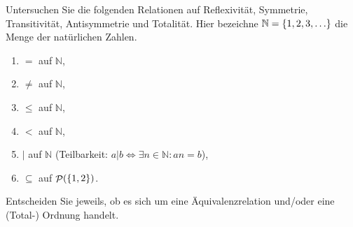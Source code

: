 \documentclass[german,12pt]{homework}
\newcommand{\NN}{\mathbb{N}}
\DeclareMathOperator{\pot}{\mathcal{P}}
\DeclarePairedDelimiter{\enbrace}{(}{)}
\DeclarePairedDelimiter{\penbrace}{\{}{\}}
\begin{document}
    \begin{problem}
        Untersuchen Sie die folgenden Relationen auf Reflexivität, Symmetrie,
        Transitivität, Antisymmetrie und Totalität. Hier bezeichne \(\NN =
        \penbrace*{1, 2, 3, \ldots}\) die Menge der natürlichen Zahlen.
        \begin{enumerate}
            \item \(=\) auf \(\NN\),
            \item \(\ne\) auf \(\NN\),
            \item \(\le\) auf \(\NN\),
            \item \(<\) auf \(\NN\),
            \item \(|\) auf \(\NN\) (Teilbarkeit: \(a | b \iff \exists{n \in
            \NN}: an = b\)),
            \item \(\subseteq\) auf \(\pot\enbrace*{\penbrace*{1, 2}}\).
        \end{enumerate}
        Entscheiden Sie jeweils, ob es sich um eine Äquivalenzrelation und/oder
        eine (Total-) Ordnung handelt.
    \end{problem}
\end{document}

